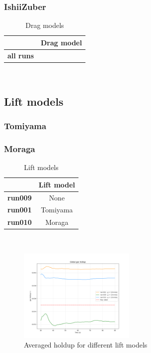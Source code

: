 \documentclass[11pt,a4paper]{article}
\begin{document}
\subsubsection{IshiiZuber}


\begin{table}[H]
    \centering 
    \begin{tabular}{|p{8em} c |}
    \hline
    \rowcolor{bluePoli!40}
    & \textbf{Drag model} \T\B \\
    \hline \hline
    \textbf{all runs} &  \T\B \\
    \hline
    \end{tabular}
    \\[10pt]
    \caption{Drag models}
    \label{table:drag_models}
\end{table}

\subsection{Lift models}
\label{sub:lift_models}

\subsubsection{Tomiyama}

\subsubsection{Moraga}

\begin{table}[H]
    \centering 
    \begin{tabular}{|p{8em} c |}
    \hline
    \rowcolor{bluePoli!40}
    & \textbf{Lift model} \T\B \\
    \hline \hline
    \textbf{run009} & None \T\B \\
    \textbf{run001} & Tomiyama \T\B \\
    \textbf{run010} & Moraga \T\B \\
    \hline
    \end{tabular}
    \\[10pt]
    \caption{Lift models}
    \label{table:lift_models}
\end{table}

\begin{figure}[H]
    \centering
    \includegraphics[width=0.5\textwidth]{Images/graphs/lift/holdUp10.png}
    \caption{Averaged holdup for different lift models}
    \label{fig:holdup_lift}
\end{figure}
\end{document}
